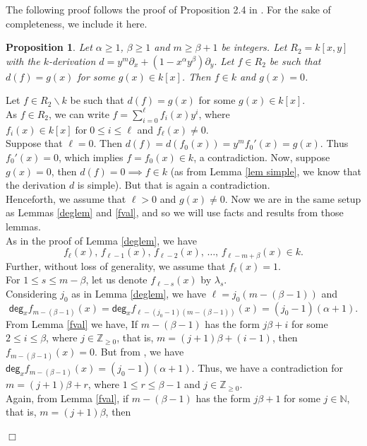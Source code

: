 \documentclass[12pt,reqno]{amsart}
\renewcommand{\deg}{\mathsf{deg}}
\renewcommand{\setminus}{\smallsetminus}
\renewcommand{\leq}{\leqslant}
\renewcommand{\geq}{\geqslant}
\numberwithin{thm}{section}
\newtheorem{prop}[thm]{Proposition}
\theoremstyle{definition}
\numberwithin{equation}{thm}
\renewenvironment{proof}{\par\noindent {\em Proof:}}{\hfill$\Box$\medskip}
\theoremstyle{plain}
\begin{document}
The following proof follows the proof of Proposition 2.4 in \cite{MMS26}. For the sake of completeness, we include it here.
\begin{prop}\label{pc=0}
Let $\alpha\geq 1$, $\beta\geq1$ and $m\geq \beta+1$ be integers. Let $R_2=k[x,y]$ with the $k$-derivation $d=y^m\partial_x+(1-x^\alpha y^\beta)\partial_y.$ Let $f\in R_2$ be such that $d(f)=g(x)$ for some $g(x)\in k[x]$. Then $f\in k$ and $g(x)=0$.
\end{prop}
\begin{proof}
Let $f\in R_2\setminus k$ be such that $d(f)=g(x)$ for some $g(x)\in k[x]$.\\
As $f\in R_2$, we can write $f=\sum_{i=0}^{\ell} f_i(x)y^i$, where $f_i(x)\in k[x] \; \text{for}\; 0\leq i \leq \ell $ and $f_\ell(x)\neq0$.\\
Suppose that $\ell=0$. Then $d(f)=d(f_0(x))=y^m f_0'(x)=g(x)$. Thus $f_0'(x)=0$, which implies $f=f_0(x)\in k$, a contradiction. Now, suppose  $g(x)=0$, then $d(f)=0\implies f\in k$ (as from Lemma \ref{lem simple}, we know that the derivation $d$ is simple). But that is again a contradiction.\\
Henceforth, we assume that $\ell>0$ and $g(x)\ne 0$. Now we are in the same setup as Lemmas \ref{deglem} and \ref{fval}, and so we will use facts and results from those lemmas.\\
As in the proof of Lemma \ref{deglem}, we have
\[
f_\ell(x),\, f_{\ell-1}(x),\, f_{\ell-2}(x),\,\dots,\,f_{\ell-m+\beta}(x)\in k.
\]
Further, without loss of generality, we assume that $f_\ell(x)=1$.\\
For $1\leq s\leq m-\beta$, let us denote $f_{\ell-s}(x)$ by $\lambda_s$.\\
Considering $j_0$ as in Lemma \ref{deglem}, we have $\ell=j_0(m-(\beta-1))$ and 
\begin{equation}\label{eq3.1}
    \deg_x f_{m-(\beta-1)}(x)=\deg_x f_{\ell-(j_0-1)(m-(\beta-1))}(x)=(j_0-1)(\alpha+1).
\end{equation}
From Lemma \ref{fval} we have, If $m-(\beta-1)$ has the form $j\beta +i$ for some $2\leq i \leq \beta$, where $j\in \mathbb{Z}_{\geq 0}$, that is, $m=(j+1)\beta+(i-1)$, then $f_{m-(\beta-1)}(x)=0$. But from , we have $\deg_x f_{m-(\beta-1)}(x)=(j_0-1)(\alpha+1)$. Thus, we have a contradiction for $m=(j+1)\beta+r$, where $1\leq r \leq \beta-1$ and $j\in \mathbb{Z}_{\geq 0}$.\\
Again, from Lemma \ref{fval}, if $m-(\beta-1)$ has the form $j\beta +1$ for some $j\in \mathbb{N}$, that is, $m=(j+1)\beta$, then 

\end{proof}
\end{document}
